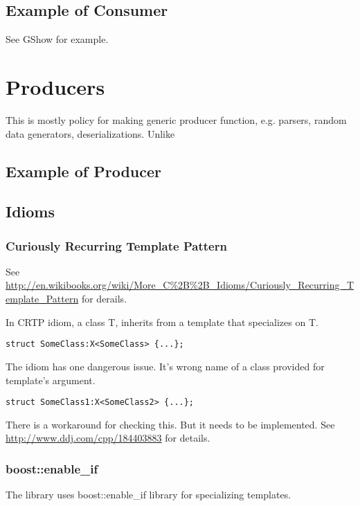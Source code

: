 \documentclass[a4paper]{article}
\begin{document}
\subsection{Example of Consumer}

See GShow for example.

\section{Producers}

This is mostly policy for making generic producer function, e.g. parsers, random data generators, deserializations.
Unlike 

\subsection{Example of Producer}

\subsection{Idioms}
\subsubsection{Curiously Recurring Template Pattern}

See \url{http://en.wikibooks.org/wiki/More_C%2B%2B_Idioms/Curiously_Recurring_Template_Pattern} for derails.

In CRTP idiom, a class T, inherits from a template that specializes on T.

\begin{lstlisting}
struct SomeClass:X<SomeClass> {...};
\end{lstlisting}

The idiom has one dangerous issue. It's wrong name of a class provided
for template's argument.

\begin{lstlisting}
struct SomeClass1:X<SomeClass2> {...};
\end{lstlisting}

There is a workaround for checking this. But it needs to be implemented.
See \url{http://www.ddj.com/cpp/184403883} for details.

\subsubsection{boost::enable\_if}

The library uses boost::enable\_if library for specializing templates.
\end{document}
